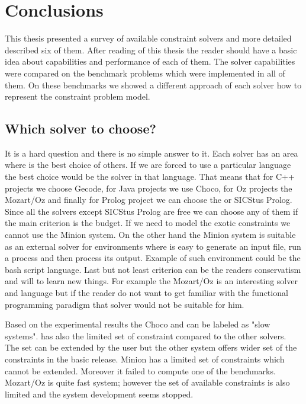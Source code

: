 \chapter{Conclusions}

This thesis presented a survey of available constraint solvers and more detailed 
described six of them. After reading of this thesis the reader should have a 
basic idea about capabilities and performance of each of them. The solver capabilities 
were compared on the benchmark problems which were implemented in all of them.
On these benchmarks we showed a different approach of each solver how to represent
the constraint problem model. 
 
\section{Which solver to choose?}
It is a hard question and there is no simple answer to it. Each solver has an area where
is the best choice of others. If we are forced to use a particular language the best choice
would be the solver in that language. That means that for C++ projects we choose Gecode,
for Java projects we use Choco, for Oz projects the Mozart/Oz and finally for Prolog
project we can choose the \eclipse or SICStus Prolog. Since all the solvers except SICStus Prolog are free
we can choose any of them if the main criterion is the budget. If we need to model the
exotic constraints we cannot use the Minion system. On the other hand the Minion system
is suitable as an external solver for environments where is easy to generate an input
file, run a process and then process its output. Example of such environment could
be the bash script language. Last but not least criterion can be the readers conservatism and 
will to learn new things. For example the Mozart/Oz is an interesting solver and language
but if the reader do not want to get familiar with the functional programming paradigm that solver would
not be suitable for him.

Based on the experimental results the Choco and \eclipse can be labeled as "slow systems".
\eclipse has also the limited set of constraint compared to the other solvers. The 
set can be extended by the user but the other system offers wider set of the 
constraints in the basic release. Minion has a limited set of constraints which 
cannot be extended. Moreover it failed to compute one of the benchmarks. Mozart/Oz
is quite fast system; however the set of available constraints is also limited and
the system development seems stopped.

